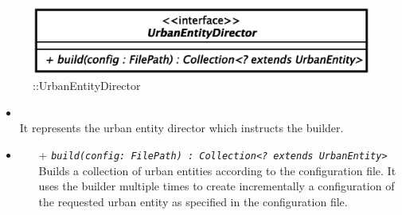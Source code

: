 \begin{figure}[h]
\centering
\includegraphics[scale=0.6,keepaspectratio]{images/solution/app/backend/urban_entity_director.eps}
\caption{\pReactiveBuild::UrbanEntityDirector}
\label{fig:sd-app-uedirector}
\end{figure}
\FloatBarrier
\begin{itemize}
  \item \textbf{\descr} \\
    It represents the urban entity director which instructs the builder.
  \item \textbf{\ops}
  \begin{itemize} 
    \item[+] \texttt{\textit{build(config: FilePath) : Collection<? extends UrbanEntity>}} \\
Builds a collection of urban entities according to the configuration file. It uses the
builder multiple times to create incrementally a configuration of the requested
urban entity as specified in the configuration file.
  \end{itemize}
\end{itemize}
